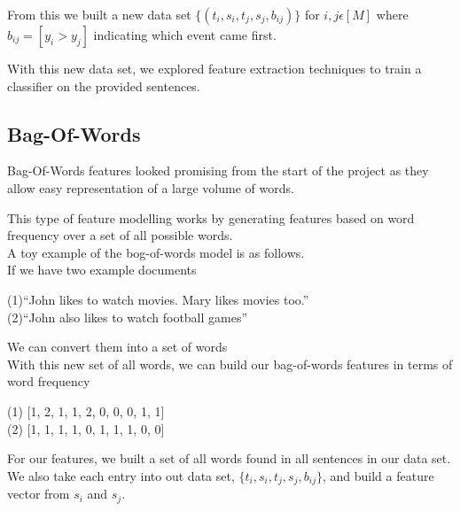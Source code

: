 \documentclass[12pt]{report}
\begin{document}
                From this we built a new data set $\{(t_{i},s_{i},t_{j},s_{j},b_{ij})\}$ for $i,j \epsilon [M]$
                where $b_{ij} = [y_{i} > y_{j}]$ indicating which event came first.

                With this new data set, we explored feature extraction techniques to train a classifier
                on the provided sentences.
                
                \subsection{Bag-Of-Words}
                Bag-Of-Words features looked promising from the start of the project
                as they allow easy representation of a large volume of words.

                This type of feature modelling works by generating features based on word
                frequency over a set of all possible words.\\

                

                \noindent A toy example of the bog-of-words model is as follows.\\
                If we have two example documents
                \begin{center}
                  (1)``John likes to watch movies. Mary likes movies too.''\\
                  (2)``John also likes to watch football games''
                \end{center}

                \noindent We can convert them into a set of words \\

                With this new set of all words, we can build our bag-of-words features
                in terms of word frequency
                \begin{center}
                (1) [1, 2, 1, 1, 2, 0, 0, 0, 1, 1]\\
                (2) [1, 1, 1, 1, 0, 1, 1, 1, 0, 0]
                \end{center}



                For our features, we built a set of all words found in all sentences in our
                data set. We also take each entry into out data set, $\{t_{i},s_{i},t_{j},s_{j},b_{ij}\}$,
                and build a feature vector from $s_{i}$ and $s_{j}$.
\end{document}
